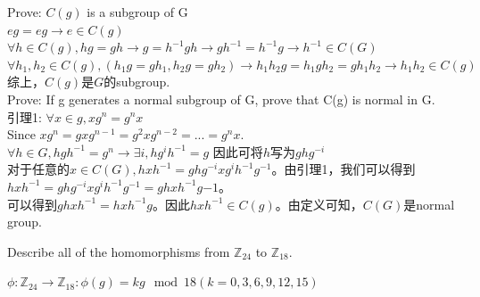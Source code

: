 \documentclass[a4paper, justified]{tufte-handout}
\begin{document}
\begin{solution}
Prove: $C(g)$  is a subgroup of G\\
$eg=eg \to e \in C(g)$\\
$\forall h\in C(g), hg=gh\to g = h^{-1}gh\to gh^{-1}=h^{-1}g\to h^{-1}\in C(G)$\\
$\forall h_1,h_2\in C(g), (h_1g=gh_1, h_2g=gh_2)\to h_1h_2g = h_1gh_2=gh_1h_2\to h_1h_2\in C(g)$\\
综上，$C(g)$是$G$的subgroup.\\

\noindent Prove: If g generates a normal subgroup of G, prove that C(g) is normal in G.\\
引理1: $\forall x \in g, xg^{n}=g^{n}x$\\
Since $xg^{n}=gxg^{n-1}=g^2xg^{n-2}=...=g^nx$.\\

\noindent $\forall h\in G, hgh^{-1}=g^{n}\to \exists i,  hg^{i}h^{-1}=g$	
因此可将$h$写为$ghg^{-i}$\\
对于任意的$x\in C(G), hxh^{-1}=ghg^{-i}xg^{i}h^{-1}g^{-1}$。由引理1，我们可以得到$hxh^{-1}=ghg^{-i}xg^{i}h^{-1}g^{-1}=ghxh^{-1}g{-1}$。\\
可以得到$ghxh^{-1}=hxh^{-1}g$。因此$hxh^{-1}\in C(g)$。由定义可知，$C(G)$是normal group.
\end{solution}


\begin{problem}[TJ 11-5]
Describe all of the homomorphisms from $\mathbb{Z}_{24}$ to $\mathbb{Z}_{18}$.
\end{problem}
\begin{solution}
$\phi: \mathbb{Z}_{24}\to \mathbb{Z}_{18} : \phi(g)=kg \mod 18(k = 0, 3, 6, 9, 12, 15)$
\end{solution}

\begin{problem}[TJ 11-2(b,d,e)]
\end{problem}
\end{document}
